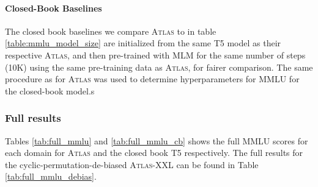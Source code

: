 \documentclass[10pt]{article} \usepackage[preprint]{tmlr}
\newcommand{\Atlas}{\textsc{Atlas}}
\begin{document}
\paragraph{Closed-Book Baselines} The closed book baselines we compare \Atlas{} to in table \ref{table:mmlu_model_size} are initialized from the same T5 model as their respective \Atlas{}, and then pre-trained with MLM for the same number of steps (10K) using the same pre-training data as \Atlas{}, for fairer comparison. The same procedure as for \Atlas{} was used to determine hyperparameters for MMLU for the closed-book model.s


\subsubsection{Full results}

Tables \ref{tab:full_mmlu} and \ref{tab:full_mmlu_cb} shows the full MMLU scores for each domain for \Atlas{} and  the closed book T5 respectively. The full results for the cyclic-permutation-de-biased \Atlas{}-XXL can be found in Table \ref{tab:full_mmlu_debias}.
\end{document}
